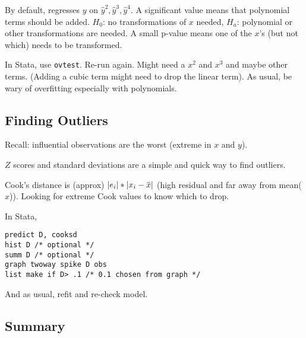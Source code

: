 \documentclass[11pt, oneside]{article}   	%
\newcommand{\overbar}[1]{\mkern 1.5mu\overline{\mkern-1.5mu#1\mkern-1.5mu}\mkern 1.5mu}
\begin{document}
By default, regresses $y$ on $\hat{y}^2, \hat{y}^3, \hat{y}^4$. A significant value means that polynomial terms should be added. $H_0$: no transformations of $x$ needed, $H_a$: polynomial or other transformations are needed. A small p-value means one of the $x$'s (but not which) needs to be transformed.

In Stata, use \texttt{ovtest}. Re-run again. Might need a $x^2$ and $x^3$ and maybe other terms. (Adding a cubic term might need to drop the linear term). As usual, be wary of overfitting especially with polynomials.

\subsection{Finding Outliers}

Recall: influential observations are the worst (extreme in $x$ and $y$). 

$Z$ scores and standard deviations are a simple and quick way to find outliers.

Cook's distance is (approx) $|e_i| * |x_i - \overbar{x}|$ (high residual and far away from mean($x$)).  Looking for extreme Cook values to know which to drop.

In Stata,
\begin{verbatim}
predict D, cooksd
hist D /* optional */
summ D /* optional */
graph twoway spike D obs
list make if D> .1 /* 0.1 chosen from graph */
\end{verbatim}

And as usual, refit and re-check model.

\subsection{Summary}
\end{document}
